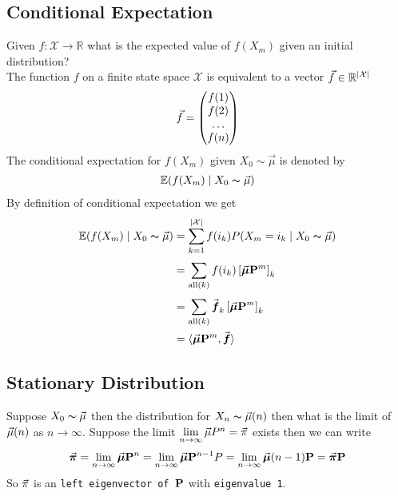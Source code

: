 \documentclass[12pt,a4paper]{article}
\begin{document}
\subsection{Conditional Expectation}
Given $f: \mathcal{X}\to \mathbb{R}$ what is the expected value of $f(X_m)$ given an initial distribution? 
\\
The function $f$ on a finite state space $\mathcal{X}$ is equivalent to a vector $\vec{f} \in \mathbb{R}^{\abs{\mathcal{X}}}$
\begin{align*}
    \vec{f} = \mqty(f(1)\\f(2)\\ \ldots \\ f(n))
\end{align*}  
The conditional expectation for $f(X_m)$ given $X_0 \sim \vec{\mu}$ is denoted by 
\begin{align*}
    \mathbb{E}(f(X_m) \;\vert\; X_0 \thicksim \vec{\mu})
\end{align*} 
By definition of conditional expectation we get
\begin{align*}
    \mathbb{E}(f(X_m) \;\vert\; X_0 \thicksim \vec{\mu}) &= \sum\limits_{k=1}^{\abs{\mathcal{X}}} f(i_k)P(X_m = i_k \;\vert\; X_0 \thicksim \vec{\mu})\\
    &= \sum\limits_{\mathrm{all}(k)}^{} f(i_k) \left[\va*{\mu} \vb{P}^m \right]_k\\
    &= \sum\limits_{\mathrm{all}(k)}^{} \va*{f}_k \left[\va*{\mu} \vb{P}^m \right]_k\\
    &= \langle\va*{\mu}\vb{P}^m, \va*{f}\rangle
\end{align*}
\newpage
\subsection{Stationary Distribution}
Suppose $X_0 \thicksim \va{\mu}$ then the distribution for $X_n \thicksim \va\mu(n)$ then what is the limit of $\va\mu(n)$ as $n\to \infty$. 
Suppose the limit $\lim\limits_{n \rightarrow \infty}\va\mu P^n = \va\pi$ exists then we can write 
\begin{align*}
    \va*{\pi} = \lim\limits_{n \rightarrow \infty}\va*{\mu}\vb{P}^n = \lim\limits_{n \rightarrow \infty}\va*{\mu}\vb{P}^{n-1}P = \lim\limits_{n \rightarrow \infty} \va*{\mu}(n-1)\vb{P} = \va*{\pi}\vb{P}
\end{align*}
So $\va\pi$ is an \texttt{left eigenvector of $\vb{P}$} with \texttt{eigenvalue 1}. 
\end{document}
